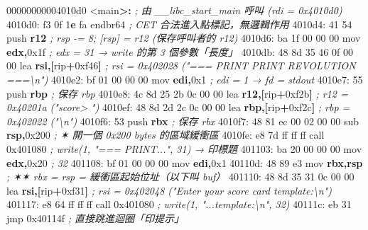 \documentclass[10pt,a4paper]{article}
\newenvironment{Shaded}{\begin{snugshade}}{\end{snugshade}}
\newcommand{\BaseNTok}[1]{\textcolor[rgb]{0.00,0.00,0.81}{#1}}
\newcommand{\BuiltInTok}[1]{#1}
\newcommand{\CommentTok}[1]{\textcolor[rgb]{0.56,0.35,0.01}{\textit{#1}}}
\newcommand{\DecValTok}[1]{\textcolor[rgb]{0.00,0.00,0.81}{#1}}
\newcommand{\ErrorTok}[1]{\textcolor[rgb]{0.64,0.00,0.00}{\textbf{#1}}}
\newcommand{\FloatTok}[1]{\textcolor[rgb]{0.00,0.00,0.81}{#1}}
\newcommand{\KeywordTok}[1]{\textcolor[rgb]{0.13,0.29,0.53}{\textbf{#1}}}
\newcommand{\NormalTok}[1]{#1}
\newcommand{\OperatorTok}[1]{\textcolor[rgb]{0.81,0.36,0.00}{\textbf{#1}}}
\renewenvironment{Shaded}{%
  \def\FrameCommand{\fboxsep=3.2pt\colorbox{shadecolor}}%
  \MakeFramed{\advance\hsize-\width\FrameRestore\small}%
}{%
  \endMakeFramed
}
\begin{document}
\begin{Shaded}
\begin{Highlighting}[]
\NormalTok{00000000004010d0 \textless{}main}\OperatorTok{\textgreater{}:}                     \CommentTok{; 由 \_\_libc\_start\_main 呼叫 (rdi = 0x4010d0)}
\NormalTok{  4010d0: f3 }\FloatTok{0}\BaseNTok{f} \DecValTok{1}\ErrorTok{e}\NormalTok{ fa        endbr64        }\CommentTok{; CET 合法進入點標記，無邏輯作用}
\NormalTok{  4010d4: 41 54              }\BuiltInTok{push} \KeywordTok{r12}        \CommentTok{; rsp {-}= 8; [rsp] = r12 (保存呼叫者的 r12)}
\NormalTok{  4010d6: ba }\FloatTok{1}\BaseNTok{f} \DecValTok{00} \DecValTok{00} \DecValTok{00}\NormalTok{     mov  }\KeywordTok{edx}\OperatorTok{,}\BaseNTok{0x1f}   \CommentTok{; edx = 31  → write 的第 3 個參數「長度」}
\NormalTok{  4010db: 48 8d 35 46 0f 00 00  }\BuiltInTok{lea} \KeywordTok{rsi}\OperatorTok{,[}\NormalTok{rip}\OperatorTok{+}\BaseNTok{0xf46}\OperatorTok{]}   \CommentTok{; rsi = 0x402028 ("=== PRINT PRINT REVOLUTION ===\textbackslash{}n")}
\NormalTok{  4010e2: bf }\DecValTok{01} \DecValTok{00} \DecValTok{00} \DecValTok{00}\NormalTok{     mov  }\KeywordTok{edi}\OperatorTok{,}\BaseNTok{0x1}    \CommentTok{; edi = 1   → fd = stdout}
\NormalTok{  4010e7: 55                 }\BuiltInTok{push} \KeywordTok{rbp}        \CommentTok{; 保存 rbp}
\NormalTok{  4010e8: 4c 8d 25 2b 0c 00 00  }\BuiltInTok{lea} \KeywordTok{r12}\OperatorTok{,[}\NormalTok{rip}\OperatorTok{+}\BaseNTok{0xf2b}\OperatorTok{]}   \CommentTok{; r12 = 0x40201a ("score\textgreater{} ")}
\NormalTok{  4010ef: 48 8d 2d 2c 0c 00 00  }\BuiltInTok{lea} \KeywordTok{rbp}\OperatorTok{,[}\NormalTok{rip}\OperatorTok{+}\BaseNTok{0xf2c}\OperatorTok{]}   \CommentTok{; rbp = 0x402022 ("\textbackslash{}n")}
\NormalTok{  4010f6: 53                 }\BuiltInTok{push} \KeywordTok{rbx}        \CommentTok{; 保存 rbx}
\NormalTok{  4010f7: 48 81 ec }\DecValTok{00} \DecValTok{02} \DecValTok{00} \DecValTok{00}\NormalTok{  sub }\KeywordTok{rsp}\OperatorTok{,}\BaseNTok{0x200}  \CommentTok{; ✶ 開一個 0x200 bytes 的區域緩衝區}
\NormalTok{  4010fe: e8 }\DecValTok{7}\BaseNTok{d}\NormalTok{ ff ff ff     call }\BaseNTok{0x401080}   \CommentTok{; write(1, "=== PRINT...", 31)  → 印標題}
\NormalTok{  401103: ba }\DecValTok{20} \DecValTok{00} \DecValTok{00} \DecValTok{00}\NormalTok{     mov  }\KeywordTok{edx}\OperatorTok{,}\BaseNTok{0x20}   \CommentTok{; 32}
\NormalTok{  401108: bf }\DecValTok{01} \DecValTok{00} \DecValTok{00} \DecValTok{00}\NormalTok{     mov  }\KeywordTok{edi}\OperatorTok{,}\BaseNTok{0x1}
\NormalTok{  40110d: 48 89 e3           mov  }\KeywordTok{rbx}\OperatorTok{,}\KeywordTok{rsp}    \CommentTok{; ✶✶ rbx = rsp = 緩衝區起始位址（以下叫 buf）}
\NormalTok{  401110: 48 8d 35 31 0c 00 00  }\BuiltInTok{lea} \KeywordTok{rsi}\OperatorTok{,[}\NormalTok{rip}\OperatorTok{+}\BaseNTok{0xf31}\OperatorTok{]}  \CommentTok{; rsi = 0x402048 ("Enter your score card template:\textbackslash{}n")}
\NormalTok{  401117: e8 }\DecValTok{64}\NormalTok{ ff ff ff     call }\BaseNTok{0x401080}   \CommentTok{; write(1, "...template:\textbackslash{}n", 32)}
\NormalTok{  40111c: eb }\DecValTok{31}\NormalTok{              jmp  }\BaseNTok{0x40114f}   \CommentTok{; 直接跳進迴圈「印提示」}


\end{Highlighting}
\end{Shaded}
\end{document}
